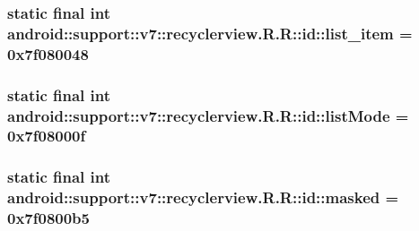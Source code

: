 \hypertarget{classandroid_1_1support_1_1v7_1_1recyclerview_1_1_r_1_1id_3dd6a44343a34f31726177e094b338c7}{
\subsubsection[{list\_\-item}]{\setlength{\rightskip}{0pt plus 5cm}static final int android::support::v7::recyclerview.R.R::id::list\_\-item = 0x7f080048}}
\label{classandroid_1_1support_1_1v7_1_1recyclerview_1_1_r_1_1id_3dd6a44343a34f31726177e094b338c7}


\hypertarget{classandroid_1_1support_1_1v7_1_1recyclerview_1_1_r_1_1id_6c33b73e9bcaf7936ffd07ad3530d767}{
\subsubsection[{listMode}]{\setlength{\rightskip}{0pt plus 5cm}static final int android::support::v7::recyclerview.R.R::id::listMode = 0x7f08000f}}
\label{classandroid_1_1support_1_1v7_1_1recyclerview_1_1_r_1_1id_6c33b73e9bcaf7936ffd07ad3530d767}


\hypertarget{classandroid_1_1support_1_1v7_1_1recyclerview_1_1_r_1_1id_cded093a4362c411b07447f679bae04b}{
\subsubsection[{masked}]{\setlength{\rightskip}{0pt plus 5cm}static final int android::support::v7::recyclerview.R.R::id::masked = 0x7f0800b5}}
\label{classandroid_1_1support_1_1v7_1_1recyclerview_1_1_r_1_1id_cded093a4362c411b07447f679bae04b}


